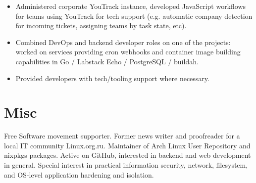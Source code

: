 \documentclass[10pt,a4]{moderncv}
\begin{document}
{\begin{itemize}
        and PostgreSQL.
    \item
        Administered corporate YouTrack instance, developed JavaScript workflows for teams using
        YouTrack for tech support (e.g. automatic company detection for incoming tickets,
        assigning teams by task state, etc).
    \item
        Combined DevOps and backend developer roles on one of the projects: worked on
        services providing cron webhooks and container image building capabilities in Go /
        Labstack Echo / PostgreSQL / buildah.
    \item
        Provided developers with tech/tooling support where necessary.
    \end{itemize}
}

\section{Misc}
Free Software movement supporter. Former news writer and proofreader for a local IT community
Linux.org.ru. Maintainer of Arch Linux User Repository and nixpkgs packages. Active on GitHub,
interested in backend and web development in general. Special interest in practical information
security, network, filesystem, and OS-level application hardening and isolation.
\end{document}

